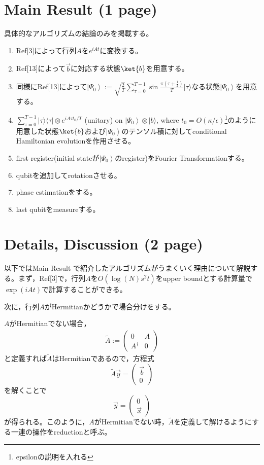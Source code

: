 \documentclass[b5paper,papersize,fleqn]{jsarticle}
\begin{document}
\section{Main Result (1 page)}
具体的なアルゴリズムの結論のみを掲載する。
\begin{enumerate}
  \item Ref[3]によって行列$A$を$e^{iAt}$に変換する。
  \item Ref[13]によって$\vec{b}$に対応する状態$\ket{b}$を用意する。
  \item 同様にRef[13]によって$\displaystyle \left|\Psi_{0}\right\rangle:=\sqrt{\frac{2}{T}} \sum_{\tau=0}^{T-1} \sin \frac{\pi\left(\tau+\frac{1}{2}\right)}{T}|\tau\rangle$なる状態$\left|\Psi_{0}\right\rangle$を用意する。
  \item $\displaystyle \sum_{\tau=0}^{T-1}|\tau\rangle\langle\tau| \otimes e^{i A \tau t_{0} / T}$ (unitary) on $\left|\Psi_{0}\right\rangle \otimes|b\rangle$, where $t_{0}=O(\kappa / \epsilon)$\footnote{epsilonの説明を入れる}のように用意した状態$\ket{b}$および$\left|\Psi_{0}\right\rangle$のテンソル積に対してconditional Hamiltonian evolutionを作用させる。
  \item first register(initial stateが$\left|\Psi_{0}\right\rangle$のregister)をFourier Transformationする。
  \item qubitを追加してrotationさせる。
  \item phase estimationをする。
  \item last qubitをmeasureする。
\end{enumerate}



\section{Details, Discussion (2 page)}
以下ではMain Result で紹介したアルゴリズムがうまくいく理由について解説する。まず，Ref[3]で，行列$A$を$O(\log(N)s^2t)$をupper boundとする計算量で$\exp(iAt)$で計算することができる。

次に，行列$A$がHermitianかどうかで場合分けをする。

$A$がHermitianでない場合，
\begin{eqnarray}
  \tilde{A}:= \left(\begin{array}{cc}
0 & A \\
A^{\dagger} & 0
\end{array}\right)
\end{eqnarray}
と定義すれば$\tilde{A}$はHermitianであるので，方程式
$$
\tilde{A} \vec{y}=\left(\begin{array}{l}
\vec{b} \\
0
\end{array}\right)
$$
を解くことで
$$
\vec{y}=\left(\begin{array}{l}
0 \\
\vec{x}
\end{array}\right)
$$
が得られる。このように，$A$がHermitianでない時，$\tilde{A}$を定義して解けるようにする一連の操作をreductionと呼ぶ。
\end{document}
